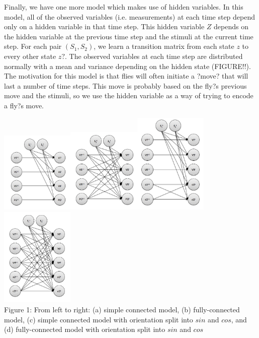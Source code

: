 \documentclass{article} %
\begin{document}
Finally, we have one more model which makes use of hidden variables. In this model, all of the observed variables (i.e. measurements) at each time step depend only on a hidden variable in that time step. This hidden variable $Z$ depends on the hidden variable at the previous time step and the stimuli at the current time step. For each pair $(S_1,S_2)$, we learn a transition matrix from each state $z$ to every other state $z?$. The observed variables at each time step are distributed normally with a mean and variance depending on the hidden state (FIGURE!!). The motivation for this model is that flies will often initiate a ?move? that will last a number of time steps. This move is probably based on the fly?s previous move and the stimuli, so we use the hidden variable as a way of trying to encode a fly?s move.

\includegraphics[width=3.5cm]{simple.jpg}\includegraphics[width=3.5cm]{full.jpg}\includegraphics[width=3.5cm]{simple-sincos.jpg}\includegraphics[width=3.5cm]{full-sincos.jpg}\\
\small{Figure 1: From left to right: (a) simple connected model, (b) fully-connected model, (c) simple connected model with orientation split into $sin$ and $cos$, and (d) fully-connected model with orientation split into $sin$ and $cos$} %
\end{document}
